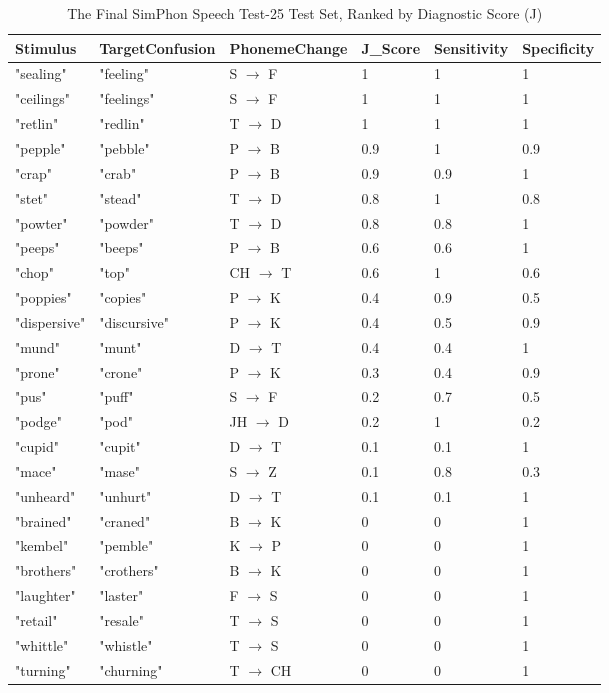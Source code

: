 \documentclass{article}
\begin{document}
\begin{table}[h!]
\centering
\caption{The Final SimPhon Speech Test-25 Test Set, Ranked by Diagnostic Score (J)}
\begin{tabular}{|l|l|l|l|l|l|}
\hline
Stimulus & TargetConfusion & PhonemeChange & J\_Score & Sensitivity & Specificity \\
\hline
"sealing" & "feeling" & S $\rightarrow$ F & 1 & 1 & 1 \\
"ceilings" & "feelings" & S $\rightarrow$ F & 1 & 1 & 1 \\
"retlin" & "redlin" & T $\rightarrow$ D & 1 & 1 & 1 \\
"pepple" & "pebble" & P $\rightarrow$ B & 0.9 & 1 & 0.9 \\
"crap" & "crab" & P $\rightarrow$ B & 0.9 & 0.9 & 1 \\
"stet" & "stead" & T $\rightarrow$ D & 0.8 & 1 & 0.8 \\
"powter" & "powder" & T $\rightarrow$ D & 0.8 & 0.8 & 1 \\
"peeps" & "beeps" & P $\rightarrow$ B & 0.6 & 0.6 & 1 \\
"chop" & "top" & CH $\rightarrow$ T & 0.6 & 1 & 0.6 \\
"poppies" & "copies" & P $\rightarrow$ K & 0.4 & 0.9 & 0.5 \\
"dispersive" & "discursive" & P $\rightarrow$ K & 0.4 & 0.5 & 0.9 \\
"mund" & "munt" & D $\rightarrow$ T & 0.4 & 0.4 & 1 \\
"prone" & "crone" & P $\rightarrow$ K & 0.3 & 0.4 & 0.9 \\
"pus" & "puff" & S $\rightarrow$ F & 0.2 & 0.7 & 0.5 \\
"podge" & "pod" & JH $\rightarrow$ D & 0.2 & 1 & 0.2 \\
"cupid" & "cupit" & D $\rightarrow$ T & 0.1 & 0.1 & 1 \\
"mace" & "mase" & S $\rightarrow$ Z & 0.1 & 0.8 & 0.3 \\
"unheard" & "unhurt" & D $\rightarrow$ T & 0.1 & 0.1 & 1 \\
"brained" & "craned" & B $\rightarrow$ K & 0 & 0 & 1 \\
"kembel" & "pemble" & K $\rightarrow$ P & 0 & 0 & 1 \\
"brothers" & "crothers" & B $\rightarrow$ K & 0 & 0 & 1 \\
"laughter" & "laster" & F $\rightarrow$ S & 0 & 0 & 1 \\
"retail" & "resale" & T $\rightarrow$ S & 0 & 0 & 1 \\
"whittle" & "whistle" & T $\rightarrow$ S & 0 & 0 & 1 \\
"turning" & "churning" & T $\rightarrow$ CH & 0 & 0 & 1 \\
\hline
\end{tabular}
\end{table}
\end{document}
